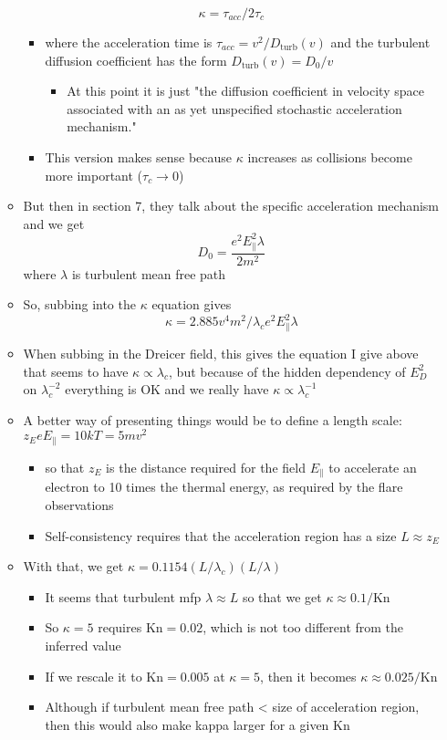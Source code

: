 \documentclass[11pt]{article}
\begin{document}
\begin{itemize}
\begin{itemize}
\[
    \kappa = \tau_{acc} / 2 \tau_{c}
    \]
\begin{itemize}
\item where the acceleration time is \(\tau_{acc} = v^{2} / D_{\text{turb}}(v)\) and the turbulent diffusion coefficient has the form \(D_{\text{turb}}(v) = D_{0}/v\)
\begin{itemize}
\item At this point it is just "the diffusion coefficient in velocity space associated with an as yet unspecified stochastic acceleration mechanism."
\end{itemize}
\item This version makes sense because \(\kappa\) increases as collisions become more important (\(\tau_{c} \to 0\))
\end{itemize}
\item But then in section 7, they talk about the specific acceleration mechanism and  we get
\[D_{0} = \frac{e^{2} E_{\parallel}^{2} \lambda} {2 m^{2}}\]
where \(\lambda\) is turbulent mean free path
\item So, subbing into the \(\kappa\) equation gives
\[ \kappa = 2.885  v^{4} m^{2} / \lambda_{c} e^{2} E_{\parallel}^{2} \lambda\]
\item When subbing in the Dreicer field, this gives the equation I give above that seems to have \(\kappa \propto \lambda_{c}\), but because of the hidden dependency of \(E_{D}^{2}\) on \(\lambda_{c}^{-2}\) everything is OK and we really have \(\kappa \propto \lambda_{c}^{-1}\)
\item A better way of presenting things would be to define a length scale: \(z_{E} e E_{\parallel} = 10 k T = 5 m v^{2}\)
\begin{itemize}
\item so that \(z_{E}\) is the distance required for the field \(E_{\parallel}\) to accelerate an electron to 10 times the thermal energy, as required by the flare observations
\item Self-consistency requires that the acceleration region has a size \(L \approx z_{E}\)
\end{itemize}
\item With that, we get \(\kappa = 0.1154 (L/\lambda_{c}) (L/\lambda)\)
\begin{itemize}
\item It seems that turbulent mfp \(\lambda \approx L\) so that we get \(\kappa \approx 0.1 /\text{Kn}\)
\item So \(\kappa = 5\) requires \(\text{Kn} = 0.02\), which is not too different from the inferred value
\item If we rescale it to \(\text{Kn} = 0.005\) at \(\kappa = 5\), then it becomes \(\kappa \approx 0.025 /\text{Kn}\)
\item Although if turbulent mean free path < size of acceleration region, then this would also make kappa larger for a given Kn
\end{itemize}
\end{itemize}
\end{itemize}
\end{document}

